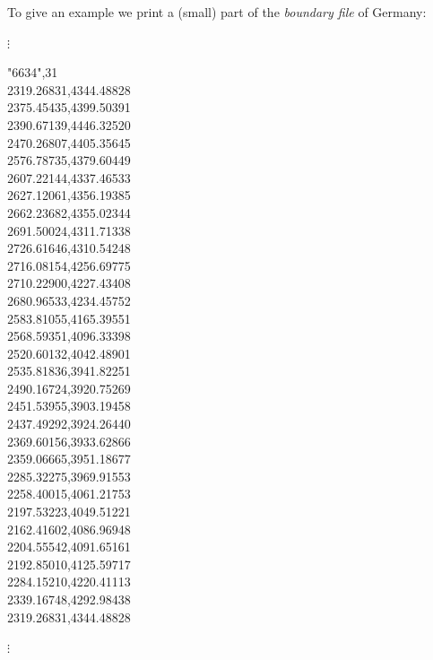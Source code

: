 To give an example we print a (small) part of the {\em boundary
file} of Germany:


\footnotesize

\hspace{1cm}  $\vdots$

"6634",31 \\
2319.26831,4344.48828 \\
2375.45435,4399.50391 \\
2390.67139,4446.32520 \\
2470.26807,4405.35645 \\
2576.78735,4379.60449 \\
2607.22144,4337.46533 \\
2627.12061,4356.19385 \\
2662.23682,4355.02344 \\
2691.50024,4311.71338 \\
2726.61646,4310.54248 \\
2716.08154,4256.69775 \\
2710.22900,4227.43408 \\
2680.96533,4234.45752 \\
2583.81055,4165.39551 \\
2568.59351,4096.33398 \\
2520.60132,4042.48901 \\
2535.81836,3941.82251 \\
2490.16724,3920.75269 \\
2451.53955,3903.19458 \\
2437.49292,3924.26440 \\
2369.60156,3933.62866 \\
2359.06665,3951.18677 \\
2285.32275,3969.91553 \\
2258.40015,4061.21753 \\
2197.53223,4049.51221 \\
2162.41602,4086.96948 \\
2204.55542,4091.65161 \\
2192.85010,4125.59717 \\
2284.15210,4220.41113 \\
2339.16748,4292.98438 \\
2319.26831,4344.48828

\hspace{1cm} $\vdots$

\normalsize

\vspace{0.3cm}

